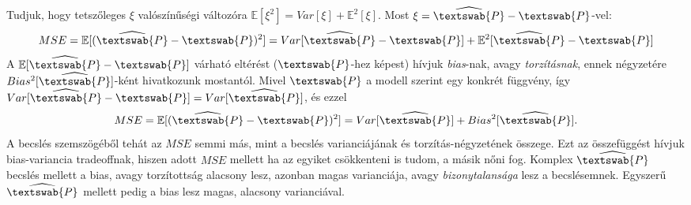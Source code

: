 \documentclass[14p]{report}
\newcounter{x}
\newcounter{y}
\newcounter{z}
\begin{document}
	\\
	\\
	Tudjuk, hogy tetszőleges $\xi$ valószínűségi változóra $\mathbb{E}[\xi^2] = Var[\xi] + \mathbb{E}^2[\xi]$. Most $\xi = \widehat{\textswab{P}} - \textswab{P}$-vel:
	\[
		MSE = \mathbb{E}[(\widehat{\textswab{P}} - \textswab{P})^2] = Var[\widehat{\textswab{P}} - \textswab{P}] + \mathbb{E}^2[\widehat{\textswab{P}} - \textswab{P}]
	\]
	A $\mathbb{E}[\widehat{\textswab{P}} - \textswab{P}]$ várható eltérést ($\textswab{P}$-hez képest) hívjuk \emph{bias}-nak, avagy \emph{torzításnak}, ennek négyzetére $Bias^2[\widehat{\textswab{P}}]$-ként hivatkozunk mostantól. Mivel $\textswab{P}$ a modell szerint egy konkrét függvény, így $Var[\widehat{\textswab{P}} - \textswab{P}] = Var[\widehat{\textswab{P}}]$, és ezzel
	\[
		MSE = \mathbb{E}[(\widehat{\textswab{P}} - \textswab{P})^2] = Var[\widehat{\textswab{P}}] + Bias^2[\widehat{\textswab{P}}].
	\]
	A becslés szemszögéből tehát az $MSE$ semmi más, mint a becslés varianciájának és torzítás-négyzetének összege. Ezt az összefüggést hívjuk bias-variancia tradeoffnak, hiszen adott $MSE$ mellett ha az egyiket csökkenteni is tudom, a másik nőni fog. Komplex $\widehat{\textswab{P}}$ becslés mellett a bias, avagy torzítottság alacsony lesz, azonban magas varianciája, avagy \emph{bizonytalansága} lesz a becslésemnek. Egyszerű $\widehat{\textswab{P}}$ mellett pedig a bias lesz magas, alacsony varianciával.
	
\end{document}
